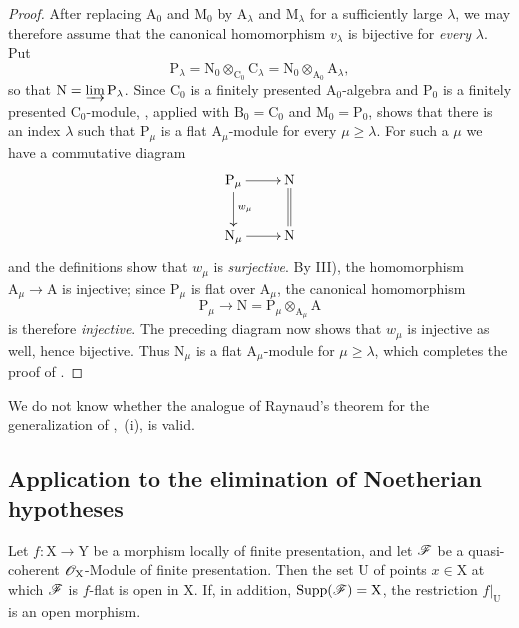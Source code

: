 \begin{proof}
After replacing $\mathrm{A}_0$ and $\mathrm{M}_0$ by
$\mathrm{A}_\lambda$ and $\mathrm{M}_\lambda$ for a sufficiently large
$\lambda$, we may therefore assume that the canonical homomorphism
$v_\lambda$ is bijective for \emph{every} $\lambda$. Put
\[
  \mathrm{P}_\lambda
  =\mathrm{N}_0\otimes_{\mathrm{C}_0}\mathrm{C}_\lambda
  =\mathrm{N}_0\otimes_{\mathrm{A}_0}\mathrm{A}_\lambda,
\]
so that $\mathrm{N}=\varinjlim\mathrm{P}_\lambda$. Since
$\mathrm{C}_0$ is a finitely presented $\mathrm{A}_0$-algebra and
$\mathrm{P}_0$ is a finitely presented $\mathrm{C}_0$-module,
, applied with
$\mathrm{B}_0=\mathrm{C}_0$ and $\mathrm{M}_0=\mathrm{P}_0$, shows that
there is an index $\lambda$ such that $\mathrm{P}_\mu$ is a flat
$\mathrm{A}_\mu$-module for every $\mu\geqslant\lambda$. For such a
$\mu$ we have a commutative diagram
\[
\xymatrix{
  \mathrm{P}_\mu \ar[r] \ar[d]^{w_\mu} & \mathrm{N} \ar@{=}[d] \\
  \mathrm{N}_\mu \ar[r] & \mathrm{N}
}
\]
and the definitions show that $w_\mu$ is \emph{surjective}. By III), the
homomorphism $\mathrm{A}_\mu\to\mathrm{A}$ is injective; since
$\mathrm{P}_\mu$ is flat over $\mathrm{A}_\mu$, the canonical
homomorphism
\[
  \mathrm{P}_\mu\longrightarrow
  \mathrm{N}
  =\mathrm{P}_\mu\otimes_{\mathrm{A}_\mu}\mathrm{A}
\]
is therefore \emph{injective}. The preceding diagram now shows that
$w_\mu$ is injective as well, hence bijective. Thus
$\mathrm{N}_\mu$ is a flat $\mathrm{A}_\mu$-module for
$\mu\geqslant\lambda$, which completes the proof of
.
\end{proof}

\begin{remark}[11.2.10]
\label{IV.11.2.10}
We do not know whether the analogue of Raynaud's theorem for the
generalization of ,~(i), is valid.
\end{remark}

\subsection{Application to the elimination of Noetherian hypotheses}
\label{subsection:IV.11.3}
\label{IV.11.3}


\begin{theorem}[11.3.1]
\label{IV.11.3.1}
Let $f:\mathrm{X}\to\mathrm{Y}$ be a morphism locally of finite
presentation, and let $\mathscr{F}$ be a quasi-coherent
$\mathscr{O}_\mathrm{X}$-Module of finite presentation. Then the set
$\mathrm{U}$ of points $x\in\mathrm{X}$ at which $\mathscr{F}$ is
$f$-flat is open in $\mathrm{X}$. If, in addition,
$\operatorname{Supp}(\mathscr{F})=\mathrm{X}$, the restriction
$f|_\mathrm{U}$ is an open morphism.
\end{theorem}

